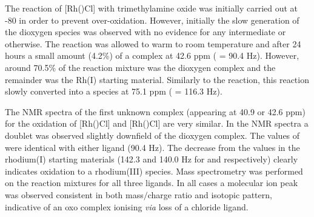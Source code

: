 The reaction of [Rh(\tBuxantphosk)Cl] with trimethylamine oxide was initially carried out at -80 \degC{} in order to prevent over-oxidation.  However, initially the slow generation of the dioxygen species was observed with no evidence for any intermediate or otherwise.  The reaction was allowed to warm to room temperature and after 24 hours a small amount (4.2\%) of a complex at 42.6 ppm (\JRhP{} = 90.4 Hz).  However, around 70.5\%{} of the reaction mixture was the dioxygen complex and the remainder was the Rh(I) starting material.  Similarly to the \tButhixantphos{} reaction, this reaction slowly converted into a species at 75.1 ppm (\JRhP{} = 116.3 Hz).  

The NMR spectra of the first unknown complex (appearing at 40.9 or 42.6 ppm) for the oxidation of [Rh(\tBuxantphosk)Cl] and [Rh(\tButhixantphosk)Cl] are very similar.  In the \phosphorus{} NMR spectra a doublet was observed slightly downfield of the dioxygen complex.  The values of \JRhP{} were identical with either ligand (90.4 Hz).  The decrease from the values in the rhodium(I) starting materials (142.3 and 140.0 Hz for \tBuxantphos{} and \tButhixantphos{} respectively) clearly indicates oxidation to a rhodium(III) species.  Mass spectrometry was performed on the reaction mixtures for all three \tBuxantphos{} ligands.  In all cases a molecular ion peak was observed consistent in both mass$/$charge ratio and isotopic pattern, indicative of an oxo complex ionising \emph{via} loss of a chloride ligand.


